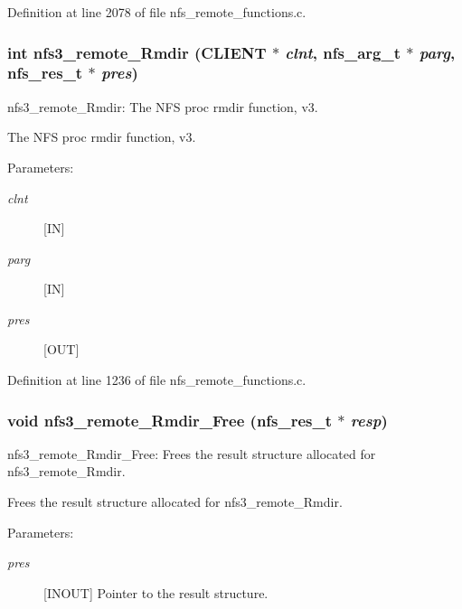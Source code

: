 Definition at line 2078 of file nfs\_\-remote\_\-functions.c.
\subsubsection[{nfs3\_\-remote\_\-Rmdir}]{\setlength{\rightskip}{0pt plus 5cm}int nfs3\_\-remote\_\-Rmdir (CLIENT $\ast$ {\em clnt}, \/  nfs\_\-arg\_\-t $\ast$ {\em parg}, \/  nfs\_\-res\_\-t $\ast$ {\em pres})}\label{group__NFSprocs_g52a02d259c08d338eed3e708e888106f}


nfs3\_\-remote\_\-Rmdir: The NFS proc rmdir function, v3.

The NFS proc rmdir function, v3.

\begin{Desc}
\item[Parameters:]
\begin{description}
\item[{\em clnt}][IN] \item[{\em parg}][IN] \item[{\em pres}][OUT] \end{description}
\end{Desc}


Definition at line 1236 of file nfs\_\-remote\_\-functions.c.
\subsubsection[{nfs3\_\-remote\_\-Rmdir\_\-Free}]{\setlength{\rightskip}{0pt plus 5cm}void nfs3\_\-remote\_\-Rmdir\_\-Free (nfs\_\-res\_\-t $\ast$ {\em resp})}\label{group__NFSprocs_gc8b97cb9507986b5220defe6194629d7}


nfs3\_\-remote\_\-Rmdir\_\-Free: Frees the result structure allocated for nfs3\_\-remote\_\-Rmdir.

Frees the result structure allocated for nfs3\_\-remote\_\-Rmdir.

\begin{Desc}
\item[Parameters:]
\begin{description}
\item[{\em pres}][INOUT] Pointer to the result structure. \end{description}
\end{Desc}



